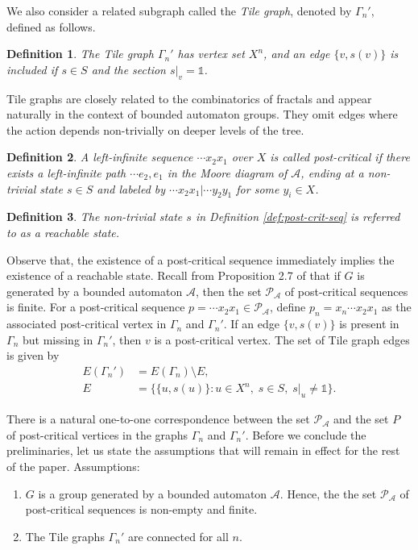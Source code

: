\documentclass{article}
\newtheorem{mydef}{Definition}[section]
\newcommand{\A}{\mathcal{A}}
\newcommand{\G}{\Gamma}
\newcommand{\id}{\mathds{1}}
\newcommand{\pc}{\mathscr{P}_{\A}}
\begin{document}
We also consider a related subgraph called the \emph{Tile graph}, denoted by $\G_n'$, defined as follows.

\begin{mydef}\label{def:tile_gr}
The Tile graph $\G_n'$ has vertex set $X^n$, and an edge $\{v, s(v)\}$ is included if $s \in S$ and the section $s|_v = \id$.
\end{mydef}

Tile graphs are closely related to the combinatorics of fractals and appear naturally in the context of bounded automaton groups. They omit edges where the action depends non-trivially on deeper levels of the tree.

\begin{mydef} \label{def:post-crit-seq}  
A left-infinite sequence $\cdots x_2x_1$ over $X$ is called \emph{post-critical} if there exists a left-infinite path $\cdots e_2, e_1$ in the Moore diagram of $\A$, ending at a non-trivial state $s \in S$ and labeled by $\cdots x_2x_1|\cdots y_2y_1$ for some $y_i \in X$.
\end{mydef}

\begin{mydef} \label{def:reachable}
The non-trivial state $s$ in Definition \eqref{def:post-crit-seq} is referred to as a \emph{reachable state}.
\end{mydef}
Observe that, the existence of a post-critical sequence immediately implies the existence of a reachable state. Recall from Proposition 2.7 of \cite{bondarenko2016ends} that if $G$ is generated by a bounded automaton $\A$, then the set $\pc$ of post-critical sequences is finite. For a post-critical sequence $p = \cdots x_2x_1 \in \pc$, define $p_n = x_n \cdots x_2x_1$ as the associated post-critical vertex in $\G_n$ and $\G_n'$. If an edge $\{v, s(v)\}$ is present in $\G_n$ but missing in $\G_n'$, then $v$ is a post-critical vertex. The set of Tile graph edges is given by
\begin{align}
E(\G_n') &= E(\G_n) \setminus E, \label{eq:nonSchreier} \\
E &= \biggl\{ \{u, s(u)\} : u \in X^n,\; s \in S,\; s|_u \neq \id \biggr\}. \label{eqn:non-tile}
\end{align}

There is a natural one-to-one correspondence between the set $\pc$ and the set $P$ of post-critical vertices in the graphs $\G_n$ and $\G_n'$.
Before we conclude the preliminaries, let us state the assumptions that will remain in effect for the rest of the paper. Assumptions:
  \begin{enumerate}
    \item \label{ass:bdd}  $G$ is a group generated by a bounded automaton $\A$. Hence, the the set $\pc$ of post-critical sequences is non-empty and finite.
  \item The Tile graphs $\G_n'$ are connected for all $n$.
  \end{enumerate}
\end{document}
